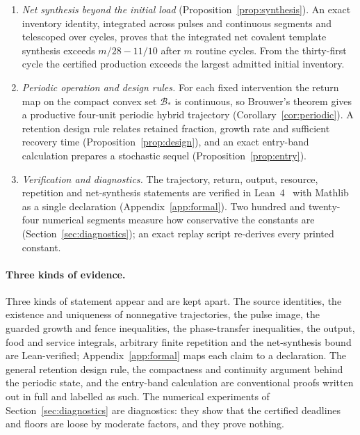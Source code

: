 \documentclass[11pt,a4paper]{article}
\theoremstyle{plain}
\theoremstyle{definition}
\theoremstyle{remark}
\newcommand{\Bstar}{\mathcal B_*}
\begin{document}
\begin{enumerate}[label=(\roman*)]
\item \emph{Net synthesis beyond the initial load} (Proposition~\ref{prop:synthesis}). An exact inventory identity, integrated across pulses and continuous segments and telescoped over cycles, proves that the integrated net covalent template synthesis exceeds $m/28-11/10$ after $m$ routine cycles. From the thirty-first cycle the certified production exceeds the largest admitted initial inventory.
\item \emph{Periodic operation and design rules.} For each fixed intervention the return map on the compact convex set $\Bstar$ is continuous, so Brouwer's theorem gives a productive four-unit periodic hybrid trajectory (Corollary~\ref{cor:periodic}). A retention design rule relates retained fraction, growth rate and sufficient recovery time (Proposition~\ref{prop:design}), and an exact entry-band calculation prepares a stochastic sequel (Proposition~\ref{prop:entry}).
\item \emph{Verification and diagnostics.} The trajectory, return, output, resource, repetition and net-synthesis statements are verified in Lean~4~\citep{demoura2021} with Mathlib~\citep{mathlib2020} as a single declaration (Appendix~\ref{app:formal}). Two hundred and twenty-four numerical segments measure how conservative the constants are (Section~\ref{sec:diagnostics}); an exact replay script re-derives every printed constant.
\end{enumerate}

\paragraph{Three kinds of evidence.}
Three kinds of statement appear and are kept apart. The source identities, the existence and uniqueness of nonnegative trajectories, the pulse image, the guarded growth and fence inequalities, the phase-transfer inequalities, the output, food and service integrals, arbitrary finite repetition and the net-synthesis bound are Lean-verified; Appendix~\ref{app:formal} maps each claim to a declaration. The general retention design rule, the compactness and continuity argument behind the periodic state, and the entry-band calculation are conventional proofs written out in full and labelled as such. The numerical experiments of Section~\ref{sec:diagnostics} are diagnostics: they show that the certified deadlines and floors are loose by moderate factors, and they prove nothing.
\end{document}
